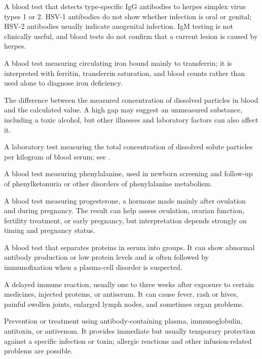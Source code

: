  A blood test that detects type-specific IgG antibodies to herpes simplex virus types 1 or 2. HSV-1 antibodies do not show whether infection is oral or genital; HSV-2 antibodies usually indicate anogenital infection. IgM testing is not clinically useful, and blood tests do not confirm that a current lesion is caused by herpes.

 A blood test measuring circulating iron bound mainly to transferrin; it is interpreted with ferritin, transferrin saturation, and blood counts rather than used alone to diagnose iron deficiency.

 The difference between the measured concentration of dissolved particles in blood and the calculated value. A high gap may suggest an unmeasured substance, including a toxic alcohol, but other illnesses and laboratory factors can also affect it.

 A laboratory test measuring the total concentration of dissolved solute particles per kilogram of blood serum; see .

 A blood test measuring phenylalanine, used in newborn screening and follow-up of phenylketonuria or other disorders of phenylalanine metabolism.

 A blood test measuring progesterone, a hormone made mainly after ovulation and during pregnancy. The result can help assess ovulation, ovarian function, fertility treatment, or early pregnancy, but interpretation depends strongly on timing and pregnancy status.

 A blood test that separates proteins in serum into groups. It can show abnormal antibody production or low protein levels and is often followed by immunofixation when a plasma-cell disorder is suspected.

 A delayed immune reaction, usually one to three weeks after exposure to certain medicines, injected proteins, or antiserum. It can cause fever, rash or hives, painful swollen joints, enlarged lymph nodes, and sometimes organ problems.

 Prevention or treatment using antibody-containing plasma, immunoglobulin, antitoxin, or antivenom. It provides immediate but usually temporary protection against a specific infection or toxin; allergic reactions and other infusion-related problems are possible.

